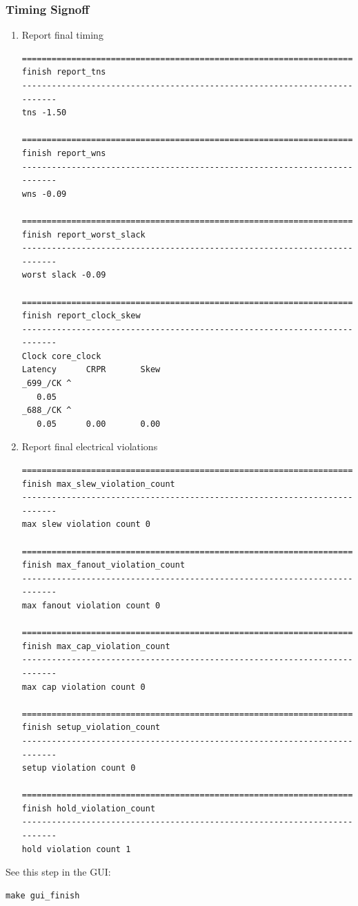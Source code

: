 \documentclass[a4paper,12pt,twoside]{article}
\begin{document}
\subsubsection{Timing Signoff}
\begin{enumerate}
    \item Report final timing
    \begin{verbatim}
==========================================================================
finish report_tns
--------------------------------------------------------------------------
tns -1.50

==========================================================================
finish report_wns
--------------------------------------------------------------------------
wns -0.09

==========================================================================
finish report_worst_slack
--------------------------------------------------------------------------
worst slack -0.09

==========================================================================
finish report_clock_skew
--------------------------------------------------------------------------
Clock core_clock
Latency      CRPR       Skew
_699_/CK ^
   0.05
_688_/CK ^
   0.05      0.00       0.00
    \end{verbatim}
    \item Report final electrical violations
    \begin{verbatim}
==========================================================================
finish max_slew_violation_count
--------------------------------------------------------------------------
max slew violation count 0

==========================================================================
finish max_fanout_violation_count
--------------------------------------------------------------------------
max fanout violation count 0

==========================================================================
finish max_cap_violation_count
--------------------------------------------------------------------------
max cap violation count 0

==========================================================================
finish setup_violation_count
--------------------------------------------------------------------------
setup violation count 0

==========================================================================
finish hold_violation_count
--------------------------------------------------------------------------
hold violation count 1
    \end{verbatim}
\end{enumerate}
See this step in the GUI:
\begin{verbatim}
make gui_finish
\end{verbatim}
\end{document}
